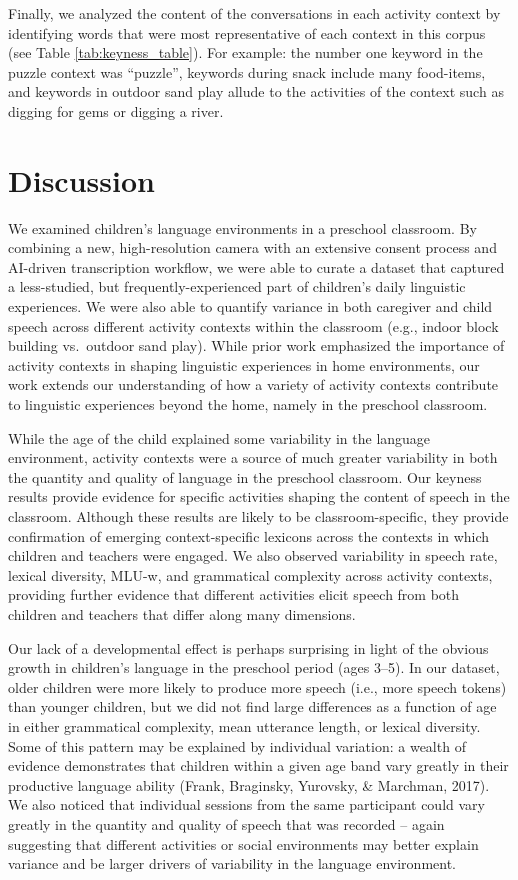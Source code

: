\documentclass[10pt, letterpaper]{article}
\begin{document}
Finally, we analyzed the content of the conversations in each activity
context by identifying words that were most representative of each
context in this corpus (see Table \ref{tab:keyness_table}). For example:
the number one keyword in the puzzle context was ``puzzle'', keywords
during snack include many food-items, and keywords in outdoor sand play
allude to the activities of the context such as digging for gems or
digging a river.

\hypertarget{discussion}{%
\section{Discussion}\label{discussion}}

We examined children's language environments in a preschool classroom.
By combining a new, high-resolution camera with an extensive consent
process and AI-driven transcription workflow, we were able to curate a
dataset that captured a less-studied, but frequently-experienced part of
children's daily linguistic experiences. We were also able to quantify
variance in both caregiver and child speech across different activity
contexts within the classroom (e.g., indoor block building vs.~outdoor
sand play). While prior work emphasized the importance of activity
contexts in shaping linguistic experiences in home environments, our
work extends our understanding of how a variety of activity contexts
contribute to linguistic experiences beyond the home, namely in the
preschool classroom.

While the age of the child explained some variability in the language
environment, activity contexts were a source of much greater variability
in both the quantity and quality of language in the preschool classroom.
Our keyness results provide evidence for specific activities shaping the
content of speech in the classroom. Although these results are likely to
be classroom-specific, they provide confirmation of emerging
context-specific lexicons across the contexts in which children and
teachers were engaged. We also observed variability in speech rate,
lexical diversity, MLU-w, and grammatical complexity across activity
contexts, providing further evidence that different activities elicit
speech from both children and teachers that differ along many
dimensions.

Our lack of a developmental effect is perhaps surprising in light of the
obvious growth in children's language in the preschool period (ages
3--5). In our dataset, older children were more likely to produce more
speech (i.e., more speech tokens) than younger children, but we did not
find large differences as a function of age in either grammatical
complexity, mean utterance length, or lexical diversity. Some of this
pattern may be explained by individual variation: a wealth of evidence
demonstrates that children within a given age band vary greatly in their
productive language ability (Frank, Braginsky, Yurovsky, \& Marchman,
2017). We also noticed that individual sessions from the same
participant could vary greatly in the quantity and quality of speech
that was recorded -- again suggesting that different activities or
social environments may better explain variance and be larger drivers of
variability in the language environment.
\end{document}
